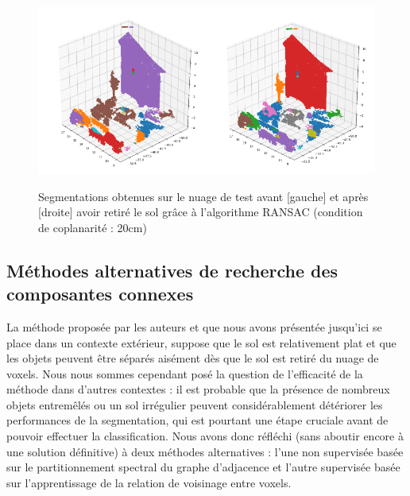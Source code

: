 \documentclass[a4paper, onecolumn, 11pt]{article}
\begin{document}
\begin{figure}[h]
    \centering
    \includegraphics[width=0.5\textwidth]{fig/first_segmentation.png}\includegraphics[width=0.5\textwidth]{fig/second_segmentation.png}
    \caption{Segmentations obtenues sur le nuage de test avant [gauche] et après [droite] avoir retiré le sol grâce à l'algorithme RANSAC (condition de coplanarité : 20cm)}
    \label{fig:first_segmentations}
\end{figure}

\subsection{Méthodes alternatives de recherche des composantes connexes}
La méthode proposée par les auteurs et que nous avons présentée jusqu'ici se place dans un contexte extérieur, suppose que le sol est relativement plat et que les objets peuvent être séparés aisément dès que le sol est retiré du nuage de voxels. Nous nous sommes cependant posé la question de l'efficacité de la méthode dans d'autres contextes : il est probable que la présence de nombreux objets entremêlés ou un sol irrégulier peuvent considérablement détériorer les performances de la segmentation, qui est pourtant une étape cruciale avant de pouvoir effectuer la classification. Nous avons donc réfléchi (sans aboutir encore à une solution définitive) à deux méthodes alternatives : l'une non supervisée basée sur le partitionnement spectral du graphe d'adjacence et l'autre supervisée basée sur l'apprentissage de la relation de voisinage entre voxels.
\end{document}
